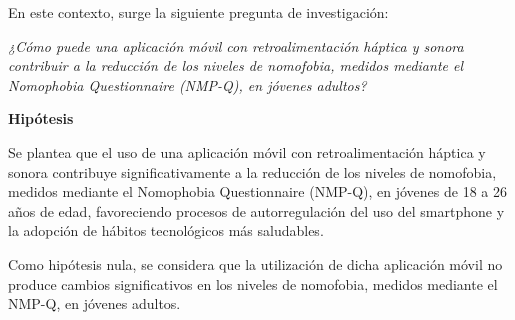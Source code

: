 En este contexto, surge la siguiente pregunta de investigación: 

\textit{¿Cómo puede una aplicación móvil con retroalimentación háptica y sonora contribuir a la reducción de los niveles de nomofobia, medidos mediante el Nomophobia Questionnaire (NMP-Q), en jóvenes adultos?}

\textbf{Hipótesis} 

Se plantea que el uso de una aplicación móvil con retroalimentación háptica y sonora contribuye significativamente a la reducción de los niveles de nomofobia, medidos mediante el Nomophobia Questionnaire (NMP-Q), en jóvenes de 18 a 26 años de edad, favoreciendo procesos de autorregulación del uso del smartphone y la adopción de hábitos tecnológicos más saludables.

Como hipótesis nula, se considera que la utilización de dicha aplicación móvil no produce cambios significativos en los niveles de nomofobia, medidos mediante el NMP-Q, en jóvenes adultos.
